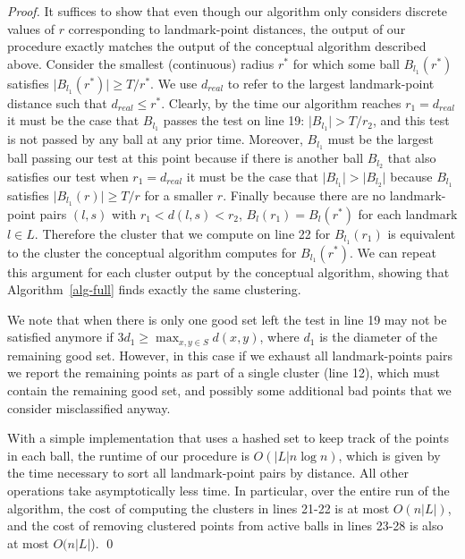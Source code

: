\documentclass{llncs} \usepackage{algorithm}
\begin{document}
\begin{proof}
It suffices to show that even though our algorithm only considers discrete values of $r$ corresponding to landmark-point distances, the output of our procedure exactly matches the output of the conceptual algorithm described above.  Consider the smallest (continuous) radius $r^{\ast}$ for which some ball $B_{l_{1}}(r^{\ast})$ satisfies $\vert B_{l_{1}}(r^{\ast}) \vert \ge T / r^{\ast}$.  We use $d_{real}$ to refer to the largest landmark-point distance such that $d_{real} \le r^{\ast}$.  Clearly, by the time our algorithm reaches $r_{1} = d_{real}$ it must be the case that $B_{l_{1}}$ passes the test on line 19: $\vert B_{l_{1}} \vert > T / r_{2}$, and this test is not passed by any ball at any prior time.  Moreover, $B_{l_{1}}$ must be the largest ball passing our test at this point because if there is another ball $B_{l_{2}}$ that also satisfies our test when $r_{1} = d_{real}$ it must be the case that $\vert B_{l_{1}} \vert > \vert B_{l_{2}} \vert$ because $B_{l_{1}}$ satisfies $\vert B_{l_{1}}(r) \vert \ge T / r$ for a smaller $r$.  Finally because there are no landmark-point pairs $(l,s)$ with $r_{1} < d(l,s) < r_{2}$, $B_{l}(r_{1}) = B_{l}(r^{\ast})$ for each landmark $l \in L$.  Therefore the cluster that we compute on line 22 for $B_{l_{1}}(r_{1})$ is equivalent to the cluster the conceptual algorithm computes for $B_{l_{1}}(r^{\ast})$.  We can repeat this argument for each cluster output by the conceptual algorithm, showing that Algorithm~\ref{alg-full} finds exactly the same clustering.

We note that when there is only one good set left the test in line 19 may not be satisfied anymore if $3d_{1} \ge \max_{x,y \in S} d(x,y)$, where $d_{1}$ is the diameter of the remaining good set.  However, in this case if we exhaust all landmark-points pairs we report the remaining points as part of a single cluster (line 12), which must contain the remaining good set, and possibly some additional bad points that we consider misclassified anyway.

With a simple implementation that uses a hashed set to keep track of the points in each ball, the runtime of our procedure is $O(\vert L \vert n \log n)$, which is given by the time necessary to sort all landmark-point pairs by distance.  All other operations take asymptotically less time.  In particular, over the entire run of the algorithm, the cost of computing the clusters in lines 21-22 is at most $O(n \vert L \vert)$, and the cost of removing clustered points from active balls in lines 23-28 is also at most $O(n \vert L \vert$). \qed

\end{proof}
\end{document}

